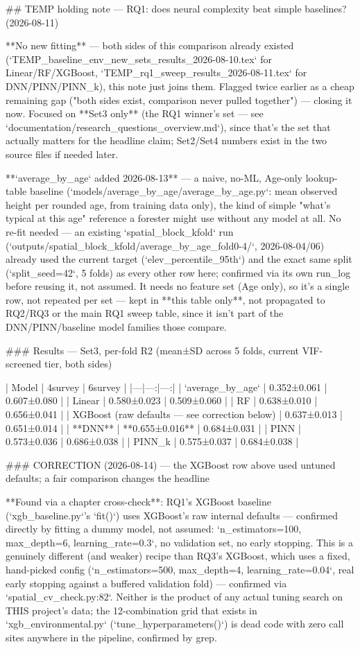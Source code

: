 ## TEMP holding note — RQ1: does neural complexity beat simple baselines? (2026-08-11)

**No new fitting** — both sides of this comparison already existed
(`TEMP_baseline_env_new_sets_results_2026-08-10.tex` for Linear/RF/XGBoost,
`TEMP_rq1_sweep_results_2026-08-11.tex` for DNN/PINN/PINN_k), this note just joins them. Flagged
twice earlier as a cheap remaining gap ("both sides exist, comparison never pulled together") —
closing it now. Focused on **Set3 only** (the RQ1 winner's set — see
`documentation/research_questions_overview.md`), since that's the set that actually matters for
the headline claim; Set2/Set4 numbers exist in the two source files if needed later.

**`average_by_age` added 2026-08-13** — a naive, no-ML, Age-only lookup-table baseline
(`models/average_by_age/average_by_age.py`: mean observed height per rounded age, from training
data only), the kind of simple "what's typical at this age" reference a forester might use without
any model at all. No re-fit needed — an existing `spatial_block_kfold` run
(`outputs/spatial_block_kfold/average_by_age_fold{0-4}/`, 2026-08-04/06) already used the current
target (`elev_percentile_95th`) and the exact same split (`split_seed=42`, 5 folds) as every other
row here; confirmed via its own run_log before reusing it, not assumed. It needs no feature set
(Age only), so it's a single row, not repeated per set — kept in **this table only**, not
propagated to RQ2/RQ3 or the main RQ1 sweep table, since it isn't part of the DNN/PINN/baseline
model families those compare.

### Results — Set3, per-fold R2 (mean±SD across 5 folds, current VIF-screened tier, both sides)

| Model | 4survey | 6survey |
|---|---:|---:|
| `average_by_age` | 0.352±0.061 | 0.607±0.080 |
| Linear | 0.580±0.023 | 0.509±0.060 |
| RF | 0.638±0.010 | 0.656±0.041 |
| XGBoost (raw defaults — see correction below) | 0.637±0.013 | 0.651±0.014 |
| **DNN** | **0.655±0.016** | 0.684±0.031 |
| PINN | 0.573±0.036 | 0.686±0.038 |
| PINN_k | 0.575±0.037 | 0.684±0.038 |

### CORRECTION (2026-08-14) — the XGBoost row above used untuned defaults; a fair comparison changes the headline

**Found via a chapter cross-check**: RQ1's XGBoost baseline (`xgb_baseline.py`'s `fit()`) uses
XGBoost's raw internal defaults — confirmed directly by fitting a dummy model, not assumed:
`n_estimators=100, max_depth=6, learning_rate=0.3`, no validation set, no early stopping. This is
a genuinely different (and weaker) recipe than RQ3's XGBoost, which uses a fixed, hand-picked
config (`n_estimators=500, max_depth=4, learning_rate=0.04`, real early stopping against a
buffered validation fold) — confirmed via `spatial_cv_check.py:82`. Neither is the product of any
actual tuning search on THIS project's data; the 12-combination grid that exists in
`xgb_environmental.py` (`tune_hyperparameters()`) is dead code with zero call sites anywhere in
the pipeline, confirmed by grep.

